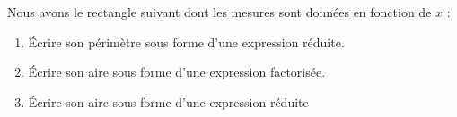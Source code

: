 
\begin{exercice}\label{exosmath-0805}

    Nous avons le rectangle suivant dont les mesures sont données en fonction de \( x\) :

\begin{center}
   
\end{center}

\begin{enumerate}
    \item
        Écrire son périmètre sous forme d'une expression réduite.
    \item
        Écrire son aire sous forme d'une expression factorisée.
    \item
        Écrire son aire sous forme d'une expression réduite
\end{enumerate}

\end{exercice}
